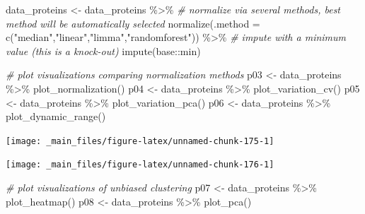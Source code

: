 \documentclass[
]{book}
\newenvironment{Shaded}{\begin{snugshade}}{\end{snugshade}}
\newcommand{\AttributeTok}[1]{\textcolor[rgb]{0.77,0.63,0.00}{#1}}
\newcommand{\CommentTok}[1]{\textcolor[rgb]{0.56,0.35,0.01}{\textit{#1}}}
\newcommand{\FunctionTok}[1]{\textcolor[rgb]{0.00,0.00,0.00}{#1}}
\newcommand{\NormalTok}[1]{#1}
\newcommand{\OtherTok}[1]{\textcolor[rgb]{0.56,0.35,0.01}{#1}}
\newcommand{\SpecialCharTok}[1]{\textcolor[rgb]{0.00,0.00,0.00}{#1}}
\newcommand{\StringTok}[1]{\textcolor[rgb]{0.31,0.60,0.02}{#1}}
\begin{document}
\begin{Shaded}
\begin{Highlighting}[]
\NormalTok{data\_proteins }\OtherTok{\textless{}{-}}\NormalTok{ data\_proteins }\SpecialCharTok{\%\textgreater{}\%}
  \CommentTok{\# normalize via several methods, best method will be automatically selected}
  \FunctionTok{normalize}\NormalTok{(}\AttributeTok{.method =} \FunctionTok{c}\NormalTok{(}\StringTok{"median"}\NormalTok{,}\StringTok{"linear"}\NormalTok{,}\StringTok{"limma"}\NormalTok{,}\StringTok{"randomforest"}\NormalTok{)) }\SpecialCharTok{\%\textgreater{}\%}
  \CommentTok{\# impute with a minimum value (this is a knock{-}out)}
  \FunctionTok{impute}\NormalTok{(base}\SpecialCharTok{::}\NormalTok{min)}

\CommentTok{\# plot visualizations comparing normalization methods}
\NormalTok{p03 }\OtherTok{\textless{}{-}}\NormalTok{ data\_proteins }\SpecialCharTok{\%\textgreater{}\%} \FunctionTok{plot\_normalization}\NormalTok{()}
\NormalTok{p04 }\OtherTok{\textless{}{-}}\NormalTok{ data\_proteins }\SpecialCharTok{\%\textgreater{}\%} \FunctionTok{plot\_variation\_cv}\NormalTok{()}
\NormalTok{p05 }\OtherTok{\textless{}{-}}\NormalTok{ data\_proteins }\SpecialCharTok{\%\textgreater{}\%} \FunctionTok{plot\_variation\_pca}\NormalTok{()}
\NormalTok{p06 }\OtherTok{\textless{}{-}}\NormalTok{ data\_proteins }\SpecialCharTok{\%\textgreater{}\%} \FunctionTok{plot\_dynamic\_range}\NormalTok{()}
\end{Highlighting}
\end{Shaded}

\begin{center}\texttt{[image: \_main\_files/figure-latex/unnamed-chunk-175-1]} \end{center}

\begin{center}\texttt{[image: \_main\_files/figure-latex/unnamed-chunk-176-1]} \end{center}

\begin{Shaded}
\begin{Highlighting}[]
\CommentTok{\# plot visualizations of unbiased clustering}
\NormalTok{p07 }\OtherTok{\textless{}{-}}\NormalTok{ data\_proteins }\SpecialCharTok{\%\textgreater{}\%} \FunctionTok{plot\_heatmap}\NormalTok{()}
\NormalTok{p08 }\OtherTok{\textless{}{-}}\NormalTok{ data\_proteins }\SpecialCharTok{\%\textgreater{}\%} \FunctionTok{plot\_pca}\NormalTok{()}
\end{Highlighting}
\end{Shaded}
\end{document}
